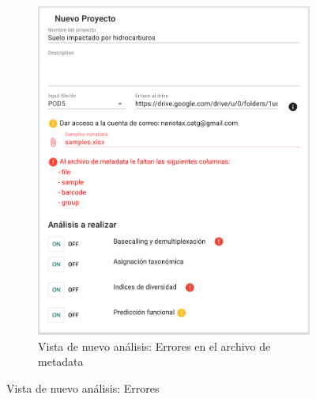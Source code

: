 \begin{figure}[H]
\begin{subfigure}[b]{0.45\textwidth}
        \includegraphics[width=\textwidth]{images/app/newAnalysis/metadata-error-1.png}
        \caption{Vista de nuevo análisis: Errores en el archivo de metadata}
        \label{fig:app-new-analysis-metadata-error}
    \end{subfigure}
    \caption{Vista de nuevo análisis: Errores }
    \label{fig:app-new-analysis-metadata-nodata-error}
\end{figure}










